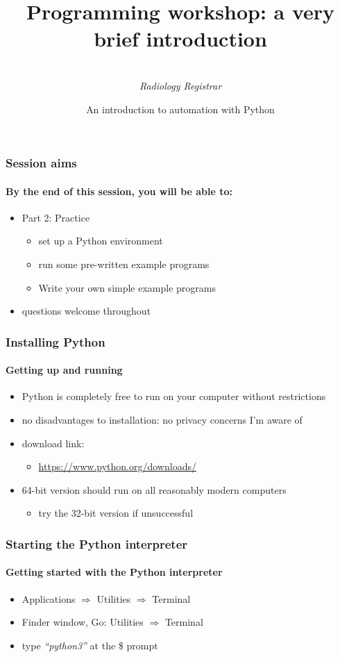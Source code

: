 \documentclass{beamer}
\title[Programming workshop]{Programming workshop: a very brief introduction}
\author{
	\sc{Mark Thurston}\\
    \textit{Radiology Registrar}
}
\institute{
	\textit{Peninsula Radiology Academy}\\
    \textit{Plymouth}
}
\date[April 2018]{An introduction to automation with Python} %
\begin{document}
    \begin{frame}[plain]
	    \titlepage
    \end{frame}


    \begin{frame}
	    \frametitle{Session aims}
	    \framesubtitle{By the end of this session, you will be able to:}

	    \begin{itemize}
		    \item Part 2: Practice
			    \begin{itemize}
				    \item set up a Python environment
				    \item run some pre-written example programs
				    \item Write your own simple example programs
			    \end{itemize}
	    \end{itemize}
	    \begin{itemize}
		    \item questions welcome throughout
	    \end{itemize}
    \end{frame}


    \begin{frame}
	    \frametitle{Installing Python}
	    \framesubtitle{Getting up and running}

	    \begin{itemize}
		    \item Python is completely free to run on your computer without restrictions
		    \item no disadvantages to installation: no privacy concerns I'm aware of
		    \item download link:
			    \begin{itemize}
				    \item \url{https://www.python.org/downloads/}
			    \end{itemize}
		    \item 64-bit version should run on all reasonably modern computers
			    \begin{itemize}
		    \item try the 32-bit version if unsuccessful
			    \end{itemize}
	    \end{itemize}
    \end{frame}
    
    
    \begin{frame}
	    \frametitle{Starting the Python interpreter}
	    \framesubtitle{Getting started with the Python interpreter}

	    \begin{itemize}
		    \item Applications $\Rightarrow$ Utilities $\Rightarrow$ Terminal
		    \item Finder window, Go: Utilities $\Rightarrow$ Terminal
		    \item type \textit{``python3''} at the \$ prompt
	    \end{itemize}
    \end{frame}
\end{document}
